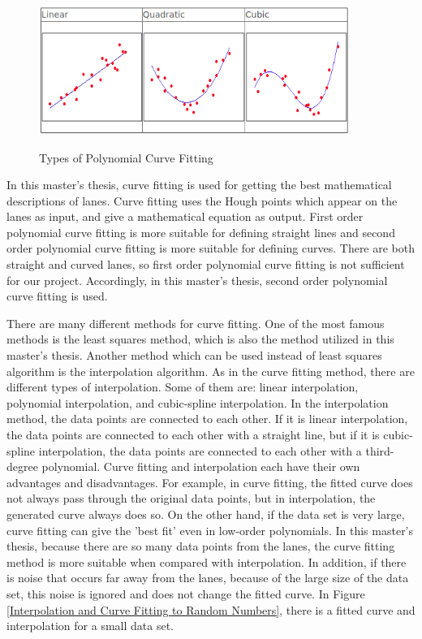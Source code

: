 \begin{figure}[H]
 \centering
  \includegraphics[width=0.9\textwidth]{./Bilder/Curve_Fitting_Polynomial.png}\label{Curve_Fitting_Polynomial}
  \caption{Types of Polynomial Curve Fitting\cite{Curve_Fitting_Polynomial}}
\end{figure}


In this master's thesis, curve fitting is used for getting the best mathematical descriptions of lanes. Curve fitting uses the Hough points which appear on the lanes as input, and give a mathematical equation as output. First order polynomial curve fitting is more suitable for defining straight lines and second order polynomial curve fitting is more suitable for defining curves. There are both straight and curved lanes, so first order polynomial curve fitting is not sufficient for our project. Accordingly, in this master's thesis, second order polynomial curve fitting is used.

There are many different methods for curve fitting. One of the most famous methods is the least squares method, which is also the method utilized in this master's thesis. Another method which can be used instead of least squares algorithm is the interpolation algorithm. As in the curve fitting method, there are different types of interpolation. Some of them are: linear interpolation, polynomial interpolation, and cubic-spline interpolation. In the interpolation method, the data points are connected to each other. If it is linear interpolation, the data points are connected to each other with a straight line, but if it is cubic-spline interpolation, the data points are connected to each other with a third-degree polynomial. Curve fitting and interpolation each have their own advantages and disadvantages. For example, in curve fitting, the fitted curve does not always pass through the original data points, but in interpolation, the generated curve always does so. On the other hand, if the data set is very large, curve fitting can give the 'best fit' even in low-order polynomials. In this master's thesis, because there are so many data points from the lanes, the curve fitting method is more suitable when compared with interpolation. In addition, if there is noise that occurs far away from the lanes, because of the large size of the data set, this noise is ignored and does not change the fitted curve. In Figure \ref{Interpolation and Curve Fitting to Random Numbers}, there is a fitted curve and interpolation for a small data set. 



